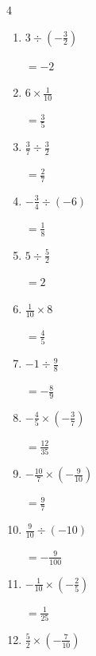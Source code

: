 \begin{multicols}{4}
\begin{enumerate}
        $\displaystyle =-\frac{9}{80}$

  \item $\displaystyle 3\div{}\left(-\frac{3}{2}\right)$

        $\displaystyle =-2$

  \item $\displaystyle 6\times{}\frac{1}{10}$

        $\displaystyle =\frac{3}{5}$

  \item $\displaystyle \frac{3}{7}\div{}\frac{3}{2}$

        $\displaystyle =\frac{2}{7}$

  \item $\displaystyle -\frac{3}{4}\div{}\left(-6\right)$

        $\displaystyle =\frac{1}{8}$

  \item $\displaystyle 5\div{}\frac{5}{2}$

        $\displaystyle =2$

  \item $\displaystyle \frac{1}{10}\times{}8$

        $\displaystyle =\frac{4}{5}$

  \item $\displaystyle -1\div{}\frac{9}{8}$

        $\displaystyle =-\frac{8}{9}$

\columnbreak %

  \item $\displaystyle -\frac{4}{5}\times{}\left(-\frac{3}{7}\right)$

        $\displaystyle =\frac{12}{35}$

  \item $\displaystyle -\frac{10}{7}\times{}\left(-\frac{9}{10}\right)$

        $\displaystyle =\frac{9}{7}$

  \item $\displaystyle \frac{9}{10}\div{}\left(-10\right)$

        $\displaystyle =-\frac{9}{100}$

  \item $\displaystyle -\frac{1}{10}\times{}\left(-\frac{2}{5}\right)$

        $\displaystyle =\frac{1}{25}$

  \item $\displaystyle \frac{5}{2}\times{}\left(-\frac{7}{10}\right)$


\end{enumerate}
\end{multicols}
